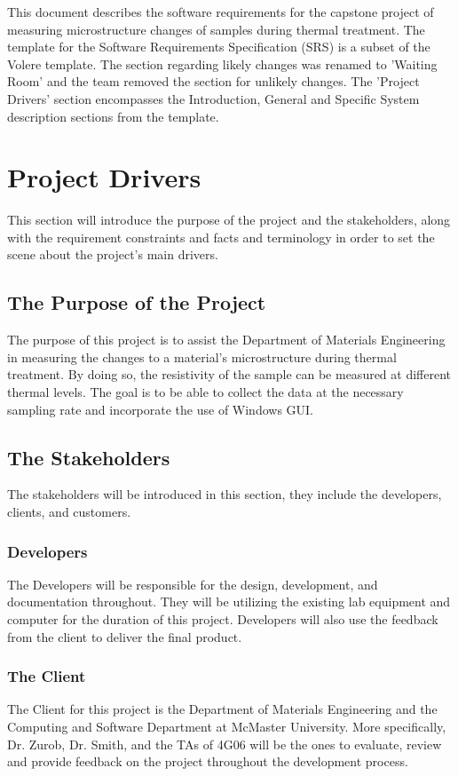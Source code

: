 \documentclass[12pt, titlepage]{article}
\begin{document}
\newpage


\noindent This document describes the software requirements for the capstone project of measuring microstructure changes of samples during thermal treatment. The template for the Software Requirements Specification (SRS) is a subset of the Volere template. The section regarding likely changes was renamed to 'Waiting Room' and the team removed the section for unlikely changes. The 'Project Drivers' section encompasses the Introduction, General and Specific System description sections from the template. 

\section{Project Drivers}

This section will introduce the purpose of the project and the stakeholders, along with the requirement constraints and facts and terminology in order to set the scene about the project's main drivers.

\subsection{The Purpose of the Project}
The purpose of this project is to assist the Department of Materials Engineering in measuring the changes to a material's microstructure during thermal treatment. 
By doing so, the resistivity of the sample can be measured at different thermal levels. The goal is to be able to collect the data at the necessary sampling rate and 
incorporate the use of Windows GUI. 

\subsection{The Stakeholders}
The stakeholders will be introduced in this section, they include the developers, clients, and customers.

\subsubsection{Developers}
The Developers will be responsible for the design, development, and documentation throughout. They will be utilizing the existing lab equipment and computer for the duration of this project.
Developers will also use the feedback from the client to deliver the final product. 

\subsubsection{The Client}
The Client for this project is the Department of Materials Engineering and the Computing and Software Department at McMaster University. More specifically, Dr. Zurob, Dr. Smith, and the TAs of 4G06 will be the ones to evaluate, review and provide feedback on the project throughout the development process.
\end{document}
